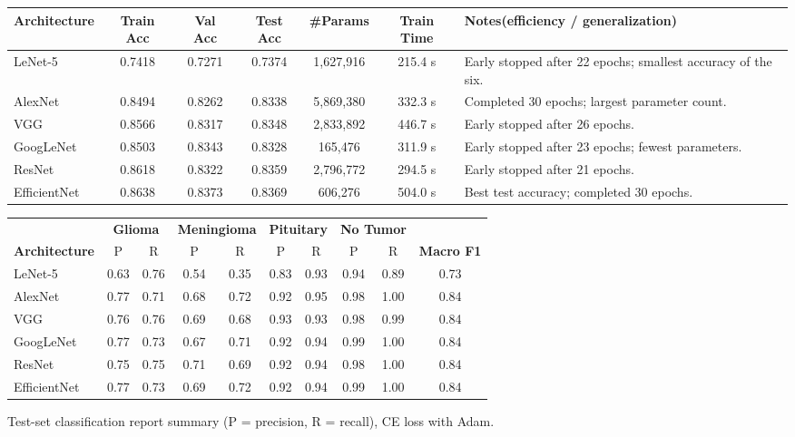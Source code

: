 \documentclass[12pt,a4paper]{article}
\begin{document}
\begin{center}
\renewcommand{\arraystretch}{1.3}
\footnotesize\setlength{\tabcolsep}{3pt}
\begin{tabularx}{\textwidth}{|l|c|c|c|c|c|X|}
\hline
\textbf{Architecture} & \textbf{Train Acc} & \textbf{Val Acc} & \textbf{Test Acc} &
\textbf{\#Params} & \textbf{Train Time} & \textbf{Notes}\newline \tiny{(efficiency / generalization)} \\
\hline
LeNet-5 & 0.7418 & 0.7271 & 0.7374 & 1,627,916 & 215.4 s & Early stopped after 22 epochs; smallest accuracy of the six. \\
\hline
AlexNet & 0.8494 & 0.8262 & 0.8338 & 5,869,380 & 332.3 s & Completed 30 epochs; largest parameter count. \\
\hline
VGG & 0.8566 & 0.8317 & 0.8348 & 2,833,892 & 446.7 s & Early stopped after 26 epochs. \\
\hline
GoogLeNet & 0.8503 & 0.8343 & 0.8328 & 165,476 & 311.9 s & Early stopped after 23 epochs; fewest parameters. \\
\hline
ResNet & 0.8618 & 0.8322 & 0.8359 & 2,796,772 & 294.5 s & Early stopped after 21 epochs. \\
\hline
EfficientNet & 0.8638 & 0.8373 & 0.8369 & 606,276 & 504.0 s & Best test accuracy; completed 30 epochs. \\
\hline
\end{tabularx}
\end{center}

\begin{center}
\renewcommand{\arraystretch}{1.2}\footnotesize
\begin{tabular}{|l|cc|cc|cc|cc|c|}
\hline
 & \multicolumn{2}{c|}{\textbf{Glioma}} & \multicolumn{2}{c|}{\textbf{Meningioma}} & \multicolumn{2}{c|}{\textbf{Pituitary}} & \multicolumn{2}{c|}{\textbf{No Tumor}} & \\
\textbf{Architecture} & P & R & P & R & P & R & P & R & \textbf{Macro F1} \\ \hline
LeNet-5 & 0.63 & 0.76 & 0.54 & 0.35 & 0.83 & 0.93 & 0.94 & 0.89 & 0.73 \\ \hline
AlexNet & 0.77 & 0.71 & 0.68 & 0.72 & 0.92 & 0.95 & 0.98 & 1.00 & 0.84 \\ \hline
VGG & 0.76 & 0.76 & 0.69 & 0.68 & 0.93 & 0.93 & 0.98 & 0.99 & 0.84 \\ \hline
GoogLeNet & 0.77 & 0.73 & 0.67 & 0.71 & 0.92 & 0.94 & 0.99 & 1.00 & 0.84 \\ \hline
ResNet & 0.75 & 0.75 & 0.71 & 0.69 & 0.92 & 0.94 & 0.98 & 1.00 & 0.84 \\ \hline
EfficientNet & 0.77 & 0.73 & 0.69 & 0.72 & 0.92 & 0.94 & 0.99 & 1.00 & 0.84 \\ \hline
\end{tabular}

\smallskip\small Test-set classification report summary (P = precision, R = recall), CE loss with Adam.
\end{center}
\end{document}
